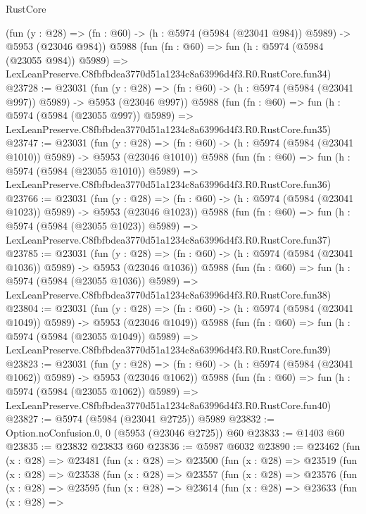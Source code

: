 \begin{lexlean}{RustCore}
\begin{coremodule}
    (fun (y : @28) => (fn : @60) -> (h : @5974 (@5984 (@23041 @984)) @5989) -> @5953 (@23046 @984))
    @5988
    (fun (fn : @60) =>
    fun (h : @5974 (@5984 (@23055 @984)) @5989) =>
    LexLeanPreserve.C8fbfbdea3770d51a1234c8a63996d4f3.R0.RustCore.fun34)
@23728 := @23031
    (fun (y : @28) => (fn : @60) -> (h : @5974 (@5984 (@23041 @997)) @5989) -> @5953 (@23046 @997))
    @5988
    (fun (fn : @60) =>
    fun (h : @5974 (@5984 (@23055 @997)) @5989) =>
    LexLeanPreserve.C8fbfbdea3770d51a1234c8a63996d4f3.R0.RustCore.fun35)
@23747 := @23031
    (fun (y : @28) =>
    (fn : @60) -> (h : @5974 (@5984 (@23041 @1010)) @5989) -> @5953 (@23046 @1010))
    @5988
    (fun (fn : @60) =>
    fun (h : @5974 (@5984 (@23055 @1010)) @5989) =>
    LexLeanPreserve.C8fbfbdea3770d51a1234c8a63996d4f3.R0.RustCore.fun36)
@23766 := @23031
    (fun (y : @28) =>
    (fn : @60) -> (h : @5974 (@5984 (@23041 @1023)) @5989) -> @5953 (@23046 @1023))
    @5988
    (fun (fn : @60) =>
    fun (h : @5974 (@5984 (@23055 @1023)) @5989) =>
    LexLeanPreserve.C8fbfbdea3770d51a1234c8a63996d4f3.R0.RustCore.fun37)
@23785 := @23031
    (fun (y : @28) =>
    (fn : @60) -> (h : @5974 (@5984 (@23041 @1036)) @5989) -> @5953 (@23046 @1036))
    @5988
    (fun (fn : @60) =>
    fun (h : @5974 (@5984 (@23055 @1036)) @5989) =>
    LexLeanPreserve.C8fbfbdea3770d51a1234c8a63996d4f3.R0.RustCore.fun38)
@23804 := @23031
    (fun (y : @28) =>
    (fn : @60) -> (h : @5974 (@5984 (@23041 @1049)) @5989) -> @5953 (@23046 @1049))
    @5988
    (fun (fn : @60) =>
    fun (h : @5974 (@5984 (@23055 @1049)) @5989) =>
    LexLeanPreserve.C8fbfbdea3770d51a1234c8a63996d4f3.R0.RustCore.fun39)
@23823 := @23031
    (fun (y : @28) =>
    (fn : @60) -> (h : @5974 (@5984 (@23041 @1062)) @5989) -> @5953 (@23046 @1062))
    @5988
    (fun (fn : @60) =>
    fun (h : @5974 (@5984 (@23055 @1062)) @5989) =>
    LexLeanPreserve.C8fbfbdea3770d51a1234c8a63996d4f3.R0.RustCore.fun40)
@23827 := @5974 (@5984 (@23041 @2725)) @5989
@23832 := Option.noConfusion.{0, 0} (@5953 (@23046 @2725)) @60
@23833 := @1403 @60
@23835 := @23832 @23833 @60
@23836 := @5987 @6032
@23890 := @23462
    (fun (x : @28) =>
    @23481
      (fun (x : @28) =>
      @23500
        (fun (x : @28) =>
        @23519
          (fun (x : @28) =>
          @23538
            (fun (x : @28) =>
            @23557
              (fun (x : @28) =>
              @23576
                (fun (x : @28) =>
                @23595
                  (fun (x : @28) =>
                  @23614
                    (fun (x : @28) =>
                    @23633
                      (fun (x : @28) =>

\end{coremodule}
\end{lexlean}
